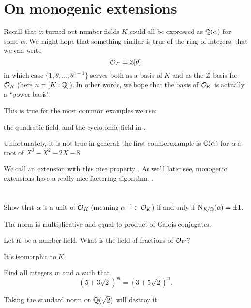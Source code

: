 \section{On monogenic extensions}
Recall that it turned out number fields $K$ could all be
expressed as $\mathbb Q(\alpha)$ for some $\alpha$.
We might hope that something similar is true of the ring of integers:
that we can write \[ \mathcal O_K = \mathbb Z[\theta] \]
in which case $\{1, \theta, \dots, \theta^{n-1}\}$
serves both as a basis of $K$ and as the $\mathbb Z$-basis for $\mathcal O_K$ (here $n = [K:\mathbb Q]$).
In other words, we hope that the basis of $\mathcal O_K$ is actually a ``power basis''.

This is true for the most common examples we use:
\begin{itemize}
	\ii the quadratic field, and
	\ii the cyclotomic field in .
\end{itemize}
Unfortunately, it is not true in general:
the first counterexample is $\mathbb Q(\alpha)$ for $\alpha$ a root of $X^3-X^2-2X-8$.

We call an extension with this nice property .
As we'll later see, monogenic extensions have a really nice factoring algorithm,
.

\section{\problemhead}

\begin{sproblem} %
	\label{prob:OK_unit_norm}
	Show that $\alpha$ is a unit of $\mathcal O_K$ (meaning $\alpha^{-1} \in \mathcal O_K$)
	if and only if $\operatorname{N}_{K/\mathbb Q}(\alpha) = \pm 1$.
	\begin{hint}
		The norm is multiplicative and equal to product of Galois conjugates.
	\end{hint}
\end{sproblem}

\begin{sproblem}
	Let $K$ be a number field.
	What is the field of fractions of $\mathcal O_K$?
	\begin{hint}
		It's isomorphic to $K$.
	\end{hint}
\end{sproblem}

\begin{problem}
	Find all integers $m$ and $n$ such that
	\[ \left( 5+3\sqrt2 \right)^m = \left( 3+5\sqrt2 \right)^n. \]
	\begin{hint}
		Taking the standard norm on $\mathbb Q(\sqrt2)$ will destroy it.
	\end{hint}
\end{problem}


